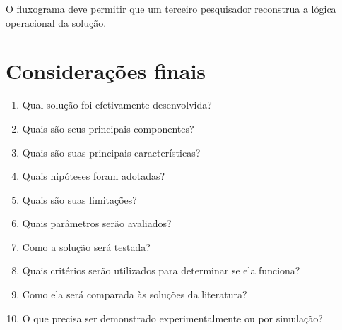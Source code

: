O fluxograma deve permitir que um terceiro pesquisador reconstrua a lógica
operacional da solução.

\section{Considerações finais}

\begin{enumerate}
	\item Qual solução foi efetivamente desenvolvida?
	\item Quais são seus principais componentes?
	\item Quais são suas principais características?
	\item Quais hipóteses foram adotadas?
	\item Quais são suas limitações?
	\item Quais parâmetros serão avaliados?
	\item Como a solução será testada?
	\item Quais critérios serão utilizados para determinar se ela funciona?
	\item Como ela será comparada às soluções da literatura?
	\item O que precisa ser demonstrado experimentalmente ou por simulação?
\end{enumerate}

